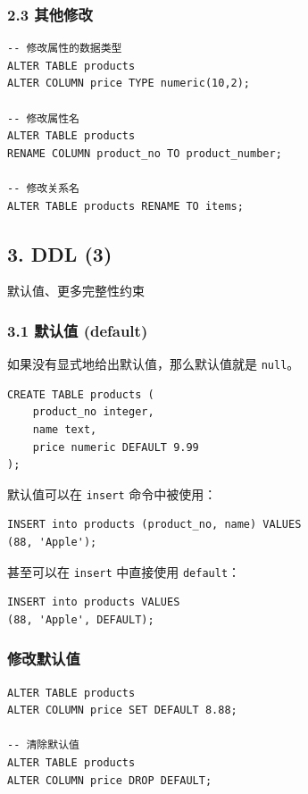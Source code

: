 \documentclass[aspectratio=169, 14pt]{beamer}
\begin{document}
\begin{frame}[fragile]
	\frametitle{2.3 其他修改}
	\begin{verbatim}
-- 修改属性的数据类型
ALTER TABLE products 
ALTER COLUMN price TYPE numeric(10,2);

-- 修改属性名
ALTER TABLE products 
RENAME COLUMN product_no TO product_number;

-- 修改关系名
ALTER TABLE products RENAME TO items;
    \end{verbatim}

\end{frame}

\begin{frame}
	\section{\textcolor{darkmidnightblue}{3. DDL (3)}}
	默认值、更多完整性约束

\end{frame}

\begin{frame}[fragile]
	\frametitle{3.1 默认值 (default)}
	如果没有显式地给出默认值，那么默认值就是 \texttt{null}。

	\begin{verbatim}
CREATE TABLE products (
    product_no integer,
    name text,
    price numeric DEFAULT 9.99
);
\end{verbatim}

\end{frame}

\begin{frame}[fragile]
	默认值可以在 \texttt{insert} 命令中被使用：

	\begin{verbatim}
INSERT into products (product_no, name) VALUES
(88, 'Apple');
    \end{verbatim}

	甚至可以在 \texttt{insert} 中直接使用 \texttt{default}：

	\begin{verbatim}
INSERT into products VALUES
(88, 'Apple', DEFAULT);
\end{verbatim}

\end{frame}

\begin{frame}[fragile]
	\frametitle{修改默认值}

	\begin{verbatim}
ALTER TABLE products 
ALTER COLUMN price SET DEFAULT 8.88;

-- 清除默认值
ALTER TABLE products 
ALTER COLUMN price DROP DEFAULT;
    \end{verbatim}

\end{frame}
\end{document}
